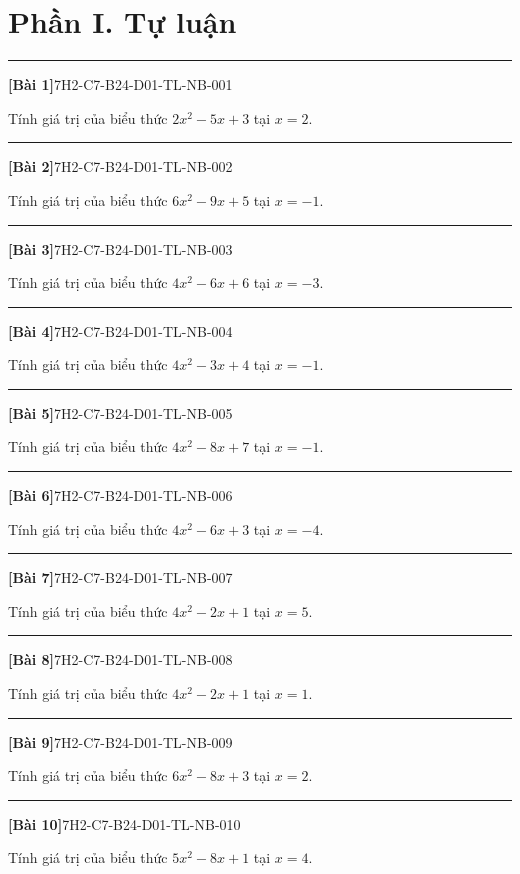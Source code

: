 \documentclass[12pt,a4paper]{article}
\newif\ifloigiai
\newenvironment{cauhoi}[2]{%
  \par\medskip\noindent\rule{\textwidth}{0.4pt}\par\nopagebreak
  \noindent\textbf{[#1]}\hfill{\scriptsize\ttfamily #2}\par\nopagebreak\smallskip}{\par}
\newcommand{\loigiai}[1]{\ifloigiai\par\smallskip\noindent\textit{Lời giải.} #1\par\fi}
\begin{document}
\section*{Phần I. Tự luận}
\begin{cauhoi}{Bài 1}{7H2-C7-B24-D01-TL-NB-001}
Tính giá trị của biểu thức $2x^{2}-5x+3$ tại $x=2$.
\loigiai{Thay $x=2$: $2\cdot(2)^{2}-5\cdot(2)+3=1$.}
\end{cauhoi}
\begin{cauhoi}{Bài 2}{7H2-C7-B24-D01-TL-NB-002}
Tính giá trị của biểu thức $6x^{2}-9x+5$ tại $x=-1$.
\loigiai{Thay $x=-1$: $6\cdot(-1)^{2}-9\cdot(-1)+5=20$.}
\end{cauhoi}
\begin{cauhoi}{Bài 3}{7H2-C7-B24-D01-TL-NB-003}
Tính giá trị của biểu thức $4x^{2}-6x+6$ tại $x=-3$.
\loigiai{Thay $x=-3$: $4\cdot(-3)^{2}-6\cdot(-3)+6=60$.}
\end{cauhoi}
\begin{cauhoi}{Bài 4}{7H2-C7-B24-D01-TL-NB-004}
Tính giá trị của biểu thức $4x^{2}-3x+4$ tại $x=-1$.
\loigiai{Thay $x=-1$: $4\cdot(-1)^{2}-3\cdot(-1)+4=11$.}
\end{cauhoi}
\begin{cauhoi}{Bài 5}{7H2-C7-B24-D01-TL-NB-005}
Tính giá trị của biểu thức $4x^{2}-8x+7$ tại $x=-1$.
\loigiai{Thay $x=-1$: $4\cdot(-1)^{2}-8\cdot(-1)+7=19$.}
\end{cauhoi}
\begin{cauhoi}{Bài 6}{7H2-C7-B24-D01-TL-NB-006}
Tính giá trị của biểu thức $4x^{2}-6x+3$ tại $x=-4$.
\loigiai{Thay $x=-4$: $4\cdot(-4)^{2}-6\cdot(-4)+3=91$.}
\end{cauhoi}
\begin{cauhoi}{Bài 7}{7H2-C7-B24-D01-TL-NB-007}
Tính giá trị của biểu thức $4x^{2}-2x+1$ tại $x=5$.
\loigiai{Thay $x=5$: $4\cdot(5)^{2}-2\cdot(5)+1=91$.}
\end{cauhoi}
\begin{cauhoi}{Bài 8}{7H2-C7-B24-D01-TL-NB-008}
Tính giá trị của biểu thức $4x^{2}-2x+1$ tại $x=1$.
\loigiai{Thay $x=1$: $4\cdot(1)^{2}-2\cdot(1)+1=3$.}
\end{cauhoi}
\begin{cauhoi}{Bài 9}{7H2-C7-B24-D01-TL-NB-009}
Tính giá trị của biểu thức $6x^{2}-8x+3$ tại $x=2$.
\loigiai{Thay $x=2$: $6\cdot(2)^{2}-8\cdot(2)+3=11$.}
\end{cauhoi}
\begin{cauhoi}{Bài 10}{7H2-C7-B24-D01-TL-NB-010}
Tính giá trị của biểu thức $5x^{2}-8x+1$ tại $x=4$.
\loigiai{Thay $x=4$: $5\cdot(4)^{2}-8\cdot(4)+1=49$.}
\end{cauhoi}
\end{document}
